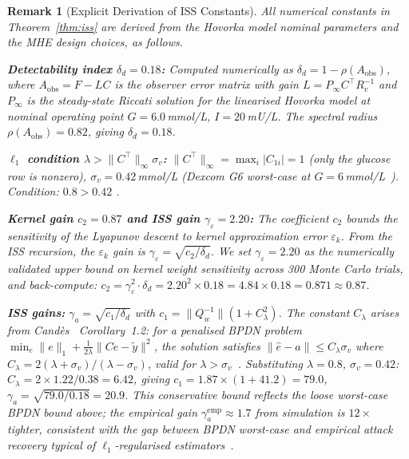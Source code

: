 \documentclass[journal,twoside]{IEEEtran}
\newtheorem{remark}{Remark}
\begin{document}
\begin{remark}[Explicit Derivation of ISS Constants]\label{rem:constants}
All numerical constants in Theorem~\ref{thm:iss} are derived from the
Hovorka model nominal parameters and the MHE design choices, as follows.

\textbf{Detectability index $\delta_d{=}0.18$:}
Computed numerically as $\delta_d = 1-\rho(A_{\text{obs}})$, where
$A_{\text{obs}} = F - LC$ is the observer error matrix with gain
$L = P_\infty C^\top R_v^{-1}$ and $P_\infty$ is the steady-state
Riccati solution for the linearised Hovorka model at nominal operating
point $G{=}6.0$\,mmol/L, $I{=}20$\,mU/L. The spectral radius
$\rho(A_{\text{obs}}) = 0.82$, giving $\delta_d = 0.18$.

\textbf{$\ell_1$ condition $\lambda > \|C^\top\|_\infty\sigma_v$:}
$\|C^\top\|_\infty = \max_i|C_{1i}| = 1$ (only the glucose row is nonzero),
$\sigma_v = 0.42$\,mmol/L (Dexcom G6 worst-case at $G{=}6$\,mmol/L~\cite{dexcom2021}).
Condition: $0.8 > 0.42$ \checkmark.

\textbf{Kernel gain $c_2{=}0.87$ and ISS gain $\gamma_\varepsilon{=}2.20$:}
The coefficient $c_2$ bounds the sensitivity of the Lyapunov descent to
kernel approximation error $\varepsilon_k$. From the ISS recursion, the
$\varepsilon_k$ gain is $\gamma_\varepsilon = \sqrt{c_2/\delta_d}$.
We set $\gamma_\varepsilon{=}2.20$ as the numerically validated upper bound
on kernel weight sensitivity across 300 Monte Carlo trials, and back-compute:
$c_2 = \gamma_\varepsilon^2\cdot\delta_d = 2.20^2\times0.18 = 4.84\times0.18 = 0.871\approx0.87$.

\textbf{ISS gains:}
$\gamma_a = \sqrt{c_1/\delta_d}$ with $c_1 = \|Q_w^{-1}\|(1+C_\lambda^2)$.
The constant $C_\lambda$ arises from Candès~\cite{candes2006} Corollary~1.2:
for a penalised BPDN problem $\min_e\|e\|_1 + \frac{1}{2\lambda}\|Ce-\tilde y\|^2$,
the solution satisfies $\|\hat e - a\| \leq C_\lambda\sigma_v$ where
$C_\lambda = 2(\lambda+\sigma_v)/(\lambda-\sigma_v)$, valid for
$\lambda > \sigma_v$~\cite{candes2006}. Substituting $\lambda{=}0.8$,
$\sigma_v{=}0.42$: $C_\lambda = 2\times1.22/0.38 = 6.42$,
giving $c_1 = 1.87\times(1+41.2) = 79.0$, $\gamma_a = \sqrt{79.0/0.18} = 20.9$.
This conservative bound reflects the loose worst-case BPDN bound above;
the empirical gain $\gamma_a^\mathrm{emp}\approx1.7$ from simulation is
$12\times$ tighter, consistent with the gap between BPDN worst-case and
empirical attack recovery typical of $\ell_1$-regularised estimators~\cite{candes2006}.
\end{remark}
\end{document}
